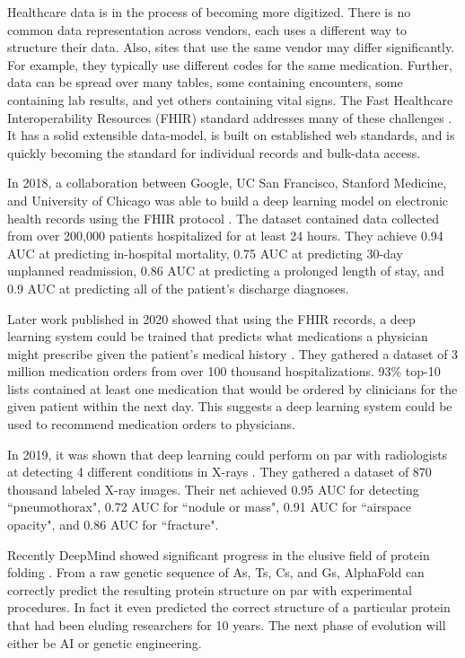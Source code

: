 Healthcare data is in the process of becoming more digitized.  There is no common data representation across vendors, each uses a different way to structure their data.  Also, sites that use the same vendor may differ significantly.  For example, they typically use different codes for the same medication. Further, data can be spread over many tables, some containing encounters, some containing lab results, and yet others containing vital signs. The Fast Healthcare Interoperability Resources (FHIR) standard addresses many of these challenges \cite{mandel2016smart}. It has a solid extensible data-model, is built on established web standards, and is quickly becoming the standard for individual records and bulk-data access.  

In 2018, a collaboration between Google, UC San Francisco, Stanford Medicine, and University of Chicago was able to build a deep learning model on electronic health records using the FHIR protocol \cite{rajkomar2018scalable}.  The dataset contained data collected from over 200,000 patients hospitalized for at least 24 hours.  They achieve 0.94 AUC at predicting in-hospital mortality, 0.75 AUC at predicting 30-day unplanned readmission, 0.86 AUC at predicting a prolonged length of stay, and 0.9 AUC at predicting all of the patient's discharge diagnoses.

Later work published in 2020 showed that using the FHIR records, a deep learning system could be trained that predicts what medications a physician might prescribe given the patient's medical history \cite{rough2020predicting}.  They gathered a dataset of 3 million medication orders from over 100 thousand hospitalizations.  93\% top-10 lists contained at least one medication that would be ordered by clinicians for the given patient within the next day.  This suggests a deep learning system could be used to recommend medication orders to physicians.

In 2019, it was shown that deep learning could perform on par with radiologists at detecting 4 different conditions in X-rays \cite{majkowska2020chest}.  They gathered a dataset of 870 thousand labeled X-ray images.  Their net achieved 0.95 AUC for detecting ``pneumothorax", 0.72 AUC for ``nodule or mass", 0.91 AUC for ``airspace opacity", and 0.86 AUC for ``fracture".

Recently DeepMind showed significant progress in the elusive field of protein folding \cite{senior2020improved}.  From a raw genetic sequence of As, Ts, Cs, and Gs, AlphaFold can correctly predict the resulting protein structure on par with experimental procedures.  In fact it even predicted the correct structure of a particular protein that had been eluding researchers for 10 years.  The next phase of evolution will either be AI or genetic engineering. 

